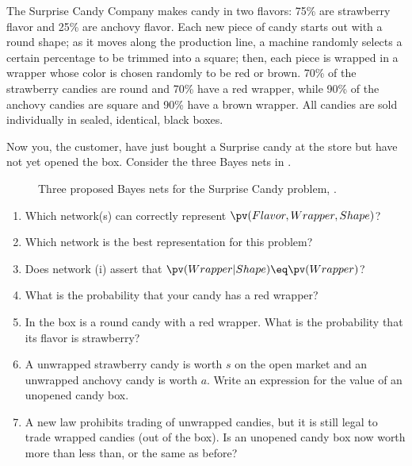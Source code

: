 \begin{iexercise}
The Surprise Candy Company makes
candy in two flavors: 75\% are strawberry flavor and 25\% are anchovy
flavor.  Each new piece of candy starts out with a round shape; as it
moves along the production line, a machine randomly selects a certain
percentage to be trimmed into a square; then, each piece is wrapped in
a wrapper whose color is chosen randomly to be red or brown.  70\% of the strawberry
candies are round and 70\% have a red wrapper, while 90\% of the
anchovy candies are square and 90\% have a brown wrapper. All candies are sold
individually in sealed, identical, black boxes.

Now you, the customer, have just bought a Surprise candy at the store
but have not yet opened the box. Consider the
three Bayes nets in .
%
\begin{figure}[htb]
{}
\caption{Three proposed Bayes nets for the Surprise Candy 
problem, . }
\label{3candy-figure}
\end{figure}
%
\begin{enumerate}
\item Which network(s) can correctly represent \(\pv(Flavor,Wrapper,Shape)\)?
\item Which network is the best representation for this problem?
\item Does network (i) assert that \(\pv(Wrapper|Shape)\eq \pv(Wrapper)\)?
\item What is the probability that your candy has a red wrapper?
\item In the box is a round candy with a red wrapper. What is the probability that its flavor is strawberry?
\item A unwrapped strawberry candy is worth \(s\) on the open market and an
         unwrapped anchovy candy is worth \(a\). Write an expression for the value of an unopened candy box.
\item A new law prohibits trading of unwrapped candies, but it is still legal to trade wrapped candies
         (out of the box). Is an unopened candy box now worth more than less than, or the same as before?
\end{enumerate}
\end{iexercise} 

